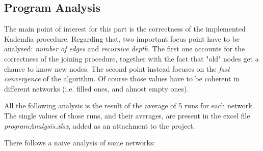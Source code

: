 \documentclass[11pt, a4paper]{report}
\begin{document}
\subsection*{Program Analysis}
\label{sec:programAnalysis}
	The main point of interest for this part is the correctness of the implemented Kademlia procedure. Regarding that, two important focus point have to be analysed: \emph{number of edges} and \emph{recursive depth}. The first one accounts for the correctness of the joining procedure, together with the fact that "old" nodes get a chance to know new nodes. The second point instead focuses on the \emph{fast convergence} of the algorithm. Of course those values have to be coherent in different networks (i.e. filled ones, and almost empty ones).
	\par
	All the following analysis is the result of the average of 5 runs for each network. The single values of those runs, and their averages, are present in the excel file \emph{programAnalysis.xlsx}, added as an attachment to the project.
	\par
	There follows a naive analysis of some networks: 
\end{document}
